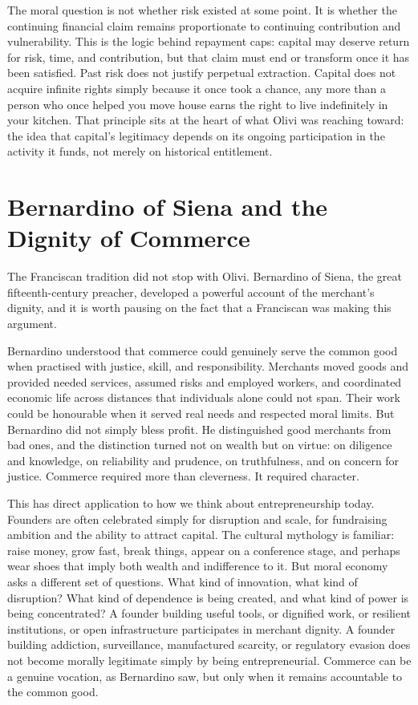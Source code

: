 \documentclass[11pt,a4paper,oneside]{book}
\begin{document}
The moral question is not whether risk existed at some point. It is whether the continuing financial claim remains proportionate to continuing contribution and vulnerability. This is the logic behind repayment caps: capital may deserve return for risk, time, and contribution, but that claim must end or transform once it has been satisfied. Past risk does not justify perpetual extraction. Capital does not acquire infinite rights simply because it once took a chance, any more than a person who once helped you move house earns the right to live indefinitely in your kitchen. That principle sits at the heart of what Olivi was reaching toward: the idea that capital's legitimacy depends on its ongoing participation in the activity it funds, not merely on historical entitlement.

\section*{Bernardino of Siena and the Dignity of Commerce}

The Franciscan tradition did not stop with Olivi. Bernardino of Siena, the great fifteenth-century preacher, developed a powerful account of the merchant's dignity, and it is worth pausing on the fact that a Franciscan was making this argument.

Bernardino understood that commerce could genuinely serve the common good when practised with justice, skill, and responsibility. Merchants moved goods and provided needed services, assumed risks and employed workers, and coordinated economic life across distances that individuals alone could not span. Their work could be honourable when it served real needs and respected moral limits. But Bernardino did not simply bless profit. He distinguished good merchants from bad ones, and the distinction turned not on wealth but on virtue: on diligence and knowledge, on reliability and prudence, on truthfulness, and on concern for justice. Commerce required more than cleverness. It required character.

This has direct application to how we think about entrepreneurship today. Founders are often celebrated simply for disruption and scale, for fundraising ambition and the ability to attract capital. The cultural mythology is familiar: raise money, grow fast, break things, appear on a conference stage, and perhaps wear shoes that imply both wealth and indifference to it. But moral economy asks a different set of questions. What kind of innovation, what kind of disruption? What kind of dependence is being created, and what kind of power is being concentrated? A founder building useful tools, or dignified work, or resilient institutions, or open infrastructure participates in merchant dignity. A founder building addiction, surveillance, manufactured scarcity, or regulatory evasion does not become morally legitimate simply by being entrepreneurial. Commerce can be a genuine vocation, as Bernardino saw, but only when it remains accountable to the common good.
\end{document}
